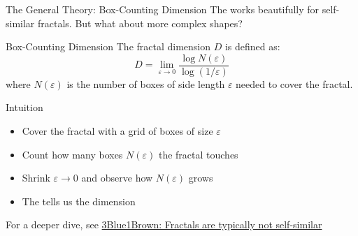 \begin{frame}[shrink]{The General Theory: Box-Counting Dimension}
  \small
  The  works beautifully for
  self-similar fractals. But what about more complex shapes?

  \vspace{0.3cm}
  \begin{mathbox}{Box-Counting Dimension}
    The fractal dimension $D$ is defined as:
    $$D = \lim_{\varepsilon \to 0}
      \frac{\log N(\varepsilon)}{\log(1/\varepsilon)}$$
    where $N(\varepsilon)$ is the number of boxes of side length
    $\varepsilon$ needed to cover the fractal.
  \end{mathbox}

  \vspace{0.3cm}
  \pause
  \begin{conceptbox}{Intuition}
    \begin{itemize}
      \item Cover the fractal with a grid of boxes of size
        $\varepsilon$
      \item Count how many boxes $N(\varepsilon)$ the fractal
        touches
      \item Shrink $\varepsilon \to 0$ and observe how
        $N(\varepsilon)$ grows
      \item The  tells us the
        dimension
    \end{itemize}
  \end{conceptbox}

  \vspace{0.2cm}
  \begin{center}
    {\footnotesize\color{DarkGray} For a deeper dive, see
    \href{https://www.youtube.com/watch?v=gB9n2gHsHN4}%
    {\textcolor{AccentColor}{3Blue1Brown:
    Fractals are typically not self-similar}}}
  \end{center}
\end{frame}

